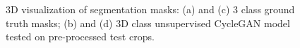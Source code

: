 \begin{figure}[!htb]
\centering
{}\hfil
{}

\hfil 
{}

\caption{\ac{3D} visualization of segmentation masks: (a) and (c) 3 class ground truth masks; (b) and (d) \ac{3D} class unsupervised CycleGAN model tested on pre-processed test crops.}

\label{fig:results-cycleGAN-3channel}



\end{figure}


